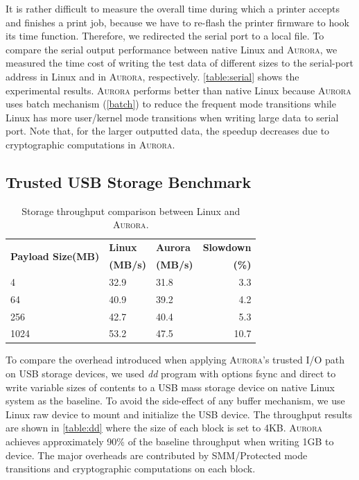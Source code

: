 It is rather difficult to measure the overall time during which a printer accepts and finishes a print job, because we have to re-flash the printer firmware to hook its time function. Therefore, we redirected the serial port to a local file. 
To compare the serial output performance between native Linux and \textsc{Aurora}, we measured the time cost of writing the test data of different sizes to the serial-port address in Linux and in \textsc{Aurora}, respectively. \autoref{table:serial} shows the experimental results. \textsc{Aurora} performs better than native Linux because \textsc{Aurora} uses batch mechanism (\autoref{batch}) to reduce the frequent mode transitions while Linux has more user/kernel mode transitions when writing large data to serial port. Note that, for the larger outputted data, the speedup decreases due to cryptographic computations in \textsc{Aurora}.

\subsection{Trusted USB Storage Benchmark}

\begin{table}[t]	
	\centering
	\caption{Storage throughput comparison between Linux and \textsc{Aurora}.}
	\label{table:dd}
	\small
	\begin{tabular}{lllr}
		\toprule
		\multirow{2}{*}{\textbf{Payload Size(MB)}} & \textbf{Linux} & \textbf{Aurora} & \textbf{Slowdown} \\ 
		& \textbf{(MB/s)} & \textbf{(MB/s)} & \textbf{(\%)} \\
		\midrule
		4 & 32.9 & 31.8 & 3.3 \\
		64 & 40.9 & 39.2 & 4.2 \\
		256 & 42.7 & 40.4 & 5.3 \\
		1024 & 53.2 & 47.5 & 10.7 \\
		\bottomrule
	\end{tabular}
\end{table}

To compare the overhead introduced when applying \textsc{Aurora}'s trusted I/O path on USB storage devices, we used \emph{dd} program with options \textsf{fsync} and \textsf{direct} to write variable sizes of contents to a USB mass storage device on native Linux system as the baseline. To avoid the side-effect of any buffer mechanism, we use Linux raw device to mount and initialize the USB device. %
The throughput results are shown in \autoref{table:dd} where the size of each block is set to 4KB. \textsc{Aurora} achieves approximately 90\% of the baseline throughput when writing 1GB to device. The major overheads are contributed by SMM/Protected mode transitions and cryptographic computations on each block.

